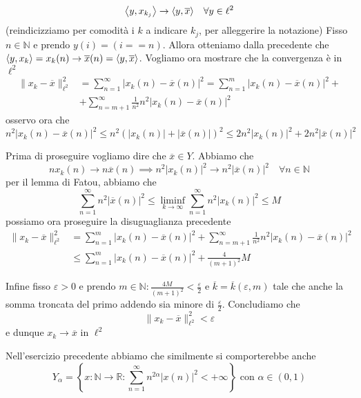 \begin{eser}{}
\begin{enumerate}[label = \arabic*.]
        \[
          {\left\langle y, x_{k_{j}} \right\rangle} \to {\left\langle y, \overline{x}\right\rangle} \quad \forall y \in
          \ell^2
        \]
    (reindicizziamo per comodità i \(k\) a indicare \(k_j\), per alleggerire la
    notazione)
    Fisso \(n \in \mathbb{N}\) e prendo \(y{(i)} = {(i == n)}\). Allora
    otteniamo dalla precedente che \({\left\langle y, x_k \right\rangle} = x_k{(n)} \to \overline{x}{(n)} = {\left\langle y, \overline{x}\right\rangle} \). Vogliamo ora mostrare che la convergenza è in \(\ell^2\) 
    \begin{align*}
        \|x_k - \overline{x}\|^2_{\ell^2} &= \sum_{n=1}^{\infty} |x_k{(n)} - \overline{x}{(n)}|^2 = \sum_{n=1}^{m} |x_k{(n)} - \overline{x}{(n)}|^2 + \\ &+ \sum_{n=m+1}^{\infty} \frac{1}{n^2} n^2 | x_k{(n)} - \overline{x}{(n)}|^2
    \end{align*}
    osservo ora che \(n^2 | x_k{(n)} - \overline{x}{(n)}|^2 \le  n^2 {( | x_k{(n)}| + |\overline{x}{(n)}| )}^2 \le  2 n^2 |x_k{(n)}|^2 + 2n^2 |\overline{x}{(n)}|^2\) 

    Prima di proseguire vogliamo dire che \(\overline{x} \in Y\). Abbiamo che
    \[
      nx_k{(n)} \to n\overline{x}{(n)} \implies n^2 |x_k{(n)}|^2 \to n^2 |\overline{x}{(n)}|^2 \quad \forall n \in \mathbb{N}
    \]
    per il lemma di Fatou, abbiamo che
    \[
      \sum_{n=1}^{\infty} n^2 | \overline{x}{(n)}|^2 \le \liminf_{k \to \infty}
      \sum_{n=1}^{\infty} n^2 | x_k{(n)}|^2 \le M
    \]
    possiamo ora proseguire la disuguaglianza precedente
    \begin{align*}
        \|x_k - \overline{x}\|^2_{\ell^2} &= \sum_{n=1}^{m} |x_k{(n)} - \overline{x}{(n)}|^2 +  \sum_{n=m+1}^{\infty} \frac{1}{n^2} n^2 | x_k{(n)} - \overline{x}{(n)}|^2 \\ &\le \sum_{n=1}^{m} |x_k{(n)} - \overline{x}{(n)}|^2 + \frac{4}{{(m+1)}^2 } M 
    \end{align*}

    Infine fisso \(\varepsilon > 0\) e prendo \(m \in \mathbb{N} : \frac{4M}{{(m+1)}^2} < \frac{\varepsilon}{2}\) e \(\overline{k} = \overline{k}{(\varepsilon, m)}\) tale che anche la somma troncata del primo addendo sia minore di \(\frac{\varepsilon}{2}\). Concludiamo che
    \[
      \|x_k - \overline{x}\|^2_{\ell^2} < \varepsilon
    \]
    e dunque \(x_k \to \overline{x}\) in \(\ell^2\) 
\end{enumerate}
\label{eser:Y}
\end{eser}
Nell'esercizio precedente abbiamo che similmente si comporterebbe anche
\[
  Y_{\alpha}  = \left\{x: \mathbb{N}\to \mathbb{R} : \sum_{n=1}^{\infty} n^{2 \alpha} |x{(n)}|^2 < +\infty  \right\} \text{ con } \alpha \in (0, 1)
\]

